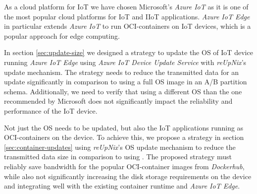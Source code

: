 As a cloud platform for \ac{IoT} we have chosen Microsoft's \textit{Azure IoT}
as it is one of the most popular cloud platforms for \ac{IoT} and \ac{IIoT} applications.
\textit{Azure IoT Edge} in particular extends \textit{Azure IoT} to run
\ac{OCI}-containers on \ac{IoT} devices, which is a popular approach for edge
computing.

In section \ref{sec:update-size} we designed a strategy to update the \ac{OS} of \ac{IoT} device running
\textit{Azure IoT Edge} using \textit{Azure IoT Device Update Service} with
\textit{reUpNix}'s update mechanism. The strategy needs to reduce the transmitted data
for an update significantly in comparison to using a full \ac{OS} image in an
A/B partition schema. Additionally, we need to verify that using a different
\ac{OS} than the one recommended by Microsoft does not significantly impact
the reliability and performance of the \ac{IoT} device.


Not just the \ac{OS} needs to be updated, but also the \ac{IoT} applications
running as \ac{OCI}-containers on the device. To achieve this,
we propose a strategy in section \ref{sec:container-updates}
using \textit{reUpNix}'s \ac{OS} update mechanism to reduce the transmitted data
size in comparison to using . The proposed strategy must
reliably save bandwidth for the popular \ac{OCI}-container images from
\textit{Dockerhub}, while also not significantly increasing the disk storage
requirements on the device and integrating well with the existing container
runtime and \textit{Azure IoT Edge}.

